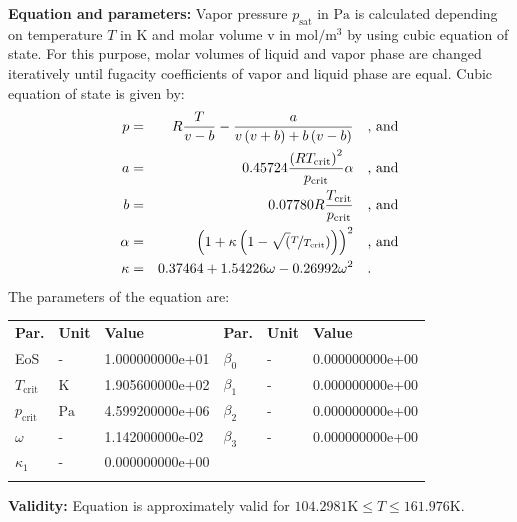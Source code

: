 \textbf{Equation and parameters:}
\newline
%
Vapor pressure $p_\mathrm{sat}$ in $\si{\pascal}$ is calculated depending on temperature $T$ in $\si{\kelvin}$ and molar volume v in $\si{\mole\per\cubic\meter}$ by using cubic equation of state. For this purpose, molar volumes of liquid and vapor phase are changed iteratively until fugacity coefficients of vapor and liquid phase are equal. Cubic equation of state is given by:
\begin{equation*}
\begin{split}
p &=& R \frac{T}{v - b} - \frac{a}{v \left(v + b\right) + b \left(v - b\right)} & \quad\text{, and} \\
a &=& 0.45724 \frac{\left(R T_\mathrm{crit} \right)^2}{p_\mathrm{crit}} \alpha & \quad\text{, and} \\
b &=& 0.07780 R \frac{T_\mathrm{crit}}{p_\mathrm{crit}} & \quad\text{, and} \\
\alpha &=& \left(1 + \kappa \left(1 - \sqrt(\nicefrac{T}{T_\mathrm{crit}}) \right) \right)^2 & \quad\text{, and} \\
\kappa &=& 0.37464 + 1.54226 \omega - 0.26992 \omega^2 & \quad\text{.}
\end{split}
\end{equation*}
%
The parameters of the equation are:
%
\begin{longtable}[l]{lll|lll}
\toprule
\addlinespace
\textbf{Par.} & \textbf{Unit} & \textbf{Value} &	\textbf{Par.} & \textbf{Unit} & \textbf{Value} \\
\addlinespace
\midrule
\endhead

\bottomrule
\endfoot
\bottomrule
\endlastfoot
\addlinespace

EoS & - & 1.000000000e+01 & $\beta_0$ & - & 0.000000000e+00 \\
$T_\mathrm{crit}$ & $\si{\kelvin}$ & 1.905600000e+02 & $\beta_1$ & - & 0.000000000e+00 \\
$p_\mathrm{crit}$ & $\si{\pascal}$ & 4.599200000e+06 & $\beta_2$ & - & 0.000000000e+00 \\
$\omega$ & - & 1.142000000e-02 & $\beta_3$ & - & 0.000000000e+00 \\
$\kappa_1$ & - & 0.000000000e+00 & & & \\

\addlinespace\end{longtable}

\textbf{Validity:}
\newline
Equation is approximately valid for $104.2981 \si{\kelvin} \leq T \leq 161.976 \si{\kelvin}$.
\newline

